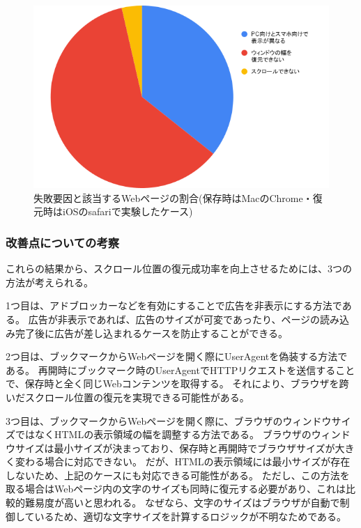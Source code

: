 \begin{figure}[htbp]
  \caption{失敗要因と該当するWebページの割合(保存時はMacのChrome・復元時はiOSのsafariで実験したケース)}
  \label{fig:evl-consideration-scroll-position-cause-ratio-multi-device}
  \begin{center}
    \includegraphics[bb=0 0 600 371,width=15cm]{img/060_evaluation/consideration/scroll_position/cause-ratio-multi-device.pdf}
  \end{center}
\end{figure}

\subsubsection{改善点についての考察}
これらの結果から、スクロール位置の復元成功率を向上させるためには、3つの方法が考えられる。

1つ目は、アドブロッカーなどを有効にすることで広告を非表示にする方法である。
広告が非表示であれば、広告のサイズが可変であったり、ページの読み込み完了後に広告が差し込まれるケースを防止することができる。

2つ目は、ブックマークからWebページを開く際にUserAgentを偽装する方法である。
再開時にブックマーク時のUserAgentでHTTPリクエストを送信することで、保存時と全く同じWebコンテンツを取得する。
それにより、ブラウザを跨いだスクロール位置の復元を実現できる可能性がある。

3つ目は、ブックマークからWebページを開く際に、ブラウザのウィンドウサイズではなくHTMLの表示領域の幅を調整する方法である。
ブラウザのウィンドウサイズは最小サイズが決まっており、保存時と再開時でブラウザサイズが大きく変わる場合に対応できない。
だが、HTMLの表示領域には最小サイズが存在しないため、上記のケースにも対応できる可能性がある。
ただし、この方法を取る場合はWebページ内の文字のサイズも同時に復元する必要があり、これは比較的難易度が高いと思われる。
なぜなら、文字のサイズはブラウザが自動で制御しているため、適切な文字サイズを計算するロジックが不明なためである。

